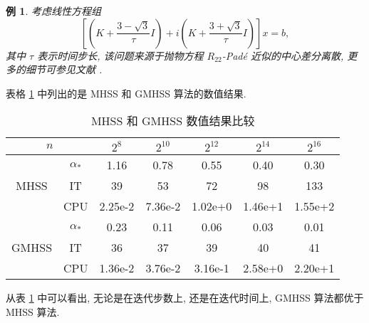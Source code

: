 \documentclass[UTF8]{ctexart}
\theoremstyle{plain}
\newtheorem{example}{例}[section]
\theoremstyle{nonumberplain}
\numberwithin{equation}{section} %
\begin{document}
\begin{example} \label{example11}
  考虑线性方程组
  $$
    \left[\left(K+\frac{3-\sqrt{3}}{\tau} I\right)
     + i\left(K+\frac{3+\sqrt{3}}{\tau} I\right)\right]x=b,
  $$
  其中 $\tau$ 表示时间步长,
  该问题来源于抛物方程 $R_{22}$-Pad\'{e} 近似的中心差分离散,
  更多的细节可参见文献 \cite{AK-00,BBC-10,BBC-11}.
\end{example}

表格 \ref{Tab:11} 中列出的是 MHSS 和 GMHSS 算法的数值结果.

\begin{table}[H]
\begin{center}
\caption{MHSS 和 GMHSS 数值结果比较\label{Tab:11}}\smallskip
\begin{tabular}{|c|c|c|c|c|c|c|} \hline
  \multicolumn{2}{|c|}{$n$}& $2^8$ &$2^{10}$ &$2^{12}$ &$2^{14}$ &$2^{16}$  \\ \hline
      & $\alpha_{*}$ & 1.16  & 0.78  & 0.55  & 0.40    & 0.30     \\ \cline{2-7}
 MHSS & IT           &  39   &  53   &  72   &  98     & 133      \\ \cline{2-7}
      & CPU          &2.25e-2&7.36e-2& 1.02e+0& 1.46e+1 & 1.55e+2  \\ \hline
      & $\alpha_{*}$ & 0.23  & 0.11  & 0.06  & 0.03    & 0.01     \\ \cline{2-7}
GMHSS & IT           &  36   &  37   &  39   &  40     & 41       \\ \cline{2-7}
      & CPU          &1.36e-2&3.76e-2&3.16e-1&  2.58e+0 & 2.20e+1  \\ \hline
\end{tabular}
\end{center}
\end{table}

从表 \ref{Tab:11} 中可以看出,
无论是在迭代步数上, 还是在迭代时间上, GMHSS 算法都优于 MHSS 算法.
\end{document}
